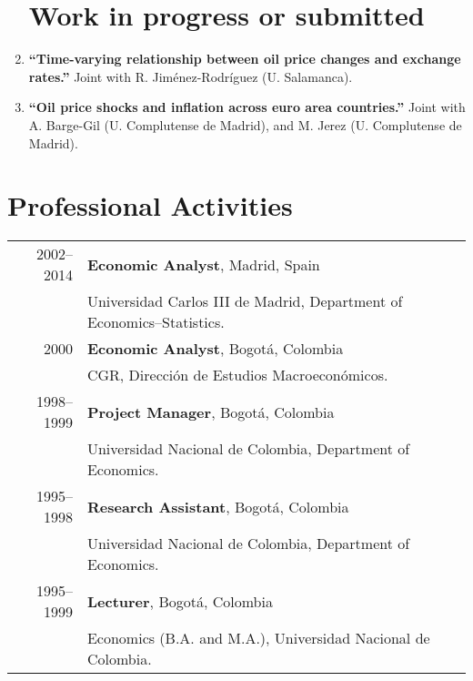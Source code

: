 \documentclass[11pt]{article}\usepackage[]{graphicx}\usepackage[]{color}
\begin{document}
\begin{enumerate}
\noindent
\section{Work in progress or submitted}

\item \textbf{``Time-varying relationship between oil price changes and exchange rates.''} Joint with R. Jiménez-Rodríguez (U. Salamanca).

\item \textbf{``Oil price shocks and inflation across euro area countries.''} Joint with A. Barge-Gil (U. Complutense de Madrid), and M. Jerez (U. Complutense de Madrid).
\\
\end{enumerate}


\section{Professional Activities} 

\begin{tabular}{rl{-2cm}}

2002--2014 &  \textbf{Economic Analyst}, Madrid, Spain\\
\vspace{5pt}& Universidad Carlos III de Madrid, Department of Economics--Statistics.\\

2000 & \textbf{Economic Analyst}, Bogotá, Colombia\\
\vspace{5pt}& CGR, Dirección de Estudios Macroeconómicos.\\

1998--1999 & \textbf{Project Manager}, Bogotá, Colombia\\
\vspace{5pt}& Universidad Nacional de Colombia, Department of Economics.\\

1995--1998 & \textbf{Research Assistant}, Bogotá, Colombia\\
\vspace{5pt}& Universidad Nacional de Colombia, Department of Economics.}\\

1995--1999 & \textbf{Lecturer}, Bogotá, Colombia\\
\vspace{5pt}& Economics (B.A. and M.A.), Universidad Nacional de Colombia.\\

\end{tabular}
\vspace{10pt}
\end{document}
